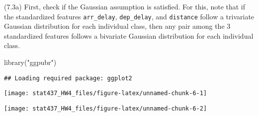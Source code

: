 \documentclass[
  11pt,
]{article}
\newenvironment{Shaded}{\begin{snugshade}}{\end{snugshade}}
\newcommand{\AttributeTok}[1]{\textcolor[rgb]{0.77,0.63,0.00}{#1}}
\newcommand{\FunctionTok}[1]{\textcolor[rgb]{0.00,0.00,0.00}{#1}}
\newcommand{\NormalTok}[1]{#1}
\newcommand{\SpecialCharTok}[1]{\textcolor[rgb]{0.00,0.00,0.00}{#1}}
\newcommand{\StringTok}[1]{\textcolor[rgb]{0.31,0.60,0.02}{#1}}
\begin{document}
(7.3a) First, check if the Gaussian assumption is satisfied. For this,
note that if the standardized features \texttt{arr\_delay},
\texttt{dep\_delay}, and \texttt{distance} follow a trivariate Gaussian
distribution for each individual class, then any pair among the 3
standardized features follows a bivariate Gaussian distribution for each
individual class.

\begin{Shaded}
\begin{Highlighting}[]
\FunctionTok{library}\NormalTok{(}\StringTok{"ggpubr"}\NormalTok{)}
\end{Highlighting}
\end{Shaded}

\begin{verbatim}
## Loading required package: ggplot2
\end{verbatim}

\begin{Shaded}
\end{Shaded}

\begin{center}\texttt{[image: stat437\_HW4\_files/figure-latex/unnamed-chunk-6-1]} \end{center}

\begin{Shaded}
\end{Shaded}

\begin{center}\texttt{[image: stat437\_HW4\_files/figure-latex/unnamed-chunk-6-2]} \end{center}

\begin{Shaded}
\end{Shaded}
\end{document}
